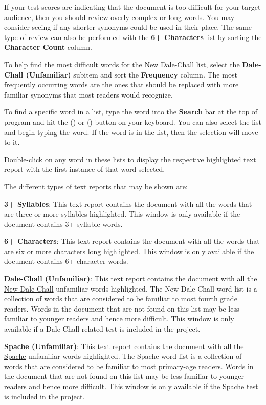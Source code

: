 \documentclass[
]{book}
\theoremstyle{definition}
\theoremstyle{definition}
\theoremstyle{definition}
\theoremstyle{definition}
\theoremstyle{remark}
\begin{document}
If your test scores are indicating that the document is too difficult for your target audience, then you should review overly complex or long words. You may consider seeing if any shorter synonyms could be used in their place. The same type of review can also be performed with the \textbf{6+ Characters} list by sorting the \textbf{Character Count} column.

To help find the most difficult words for the New Dale-Chall list, select the \textbf{Dale-Chall (Unfamiliar)} subitem and sort the \textbf{Frequency} column. The most frequently occurring words are the ones that should be replaced with more familiar synonyms that most readers would recognize.

To find a specific word in a list, type the word into the \textbf{Search} bar at the top of program and hit the  (\faWindows) or \keys{\enter} (\faApple) button on your keyboard. You can also select the list and begin typing the word. If the word is in the list, then the selection will move to it.

Double-click on any word in these lists to display the respective highlighted text report with the first instance of that word selected.

The different types of text reports that may be shown are:

\textbf{3+ Syllables}: This text report contains the document with all the words that are three or more syllables highlighted. This window is only available if the document contains 3+ syllable words.

\textbf{6+ Characters}: This text report contains the document with all the words that are six or more characters long highlighted. This window is only available if the document contains 6+ character words.

\textbf{Dale-Chall (Unfamiliar)}: This text report contains the document with all the \protect\hyperlink{dale-chall-test}{New Dale-Chall} unfamiliar words highlighted. The New Dale-Chall word list is a collection of words that are considered to be familiar to most fourth grade readers. Words in the document that are not found on this list may be less familiar to younger readers and hence more difficult. This window is only available if a Dale-Chall related test is included in the project.

\textbf{Spache (Unfamiliar)}: This text report contains the document with all the \protect\hyperlink{spache-test}{Spache} unfamiliar words highlighted. The Spache word list is a collection of words that are considered to be familiar to most primary-age readers. Words in the document that are not found on this list may be less familiar to younger readers and hence more difficult. This window is only available if the Spache test is included in the project.
\end{document}
